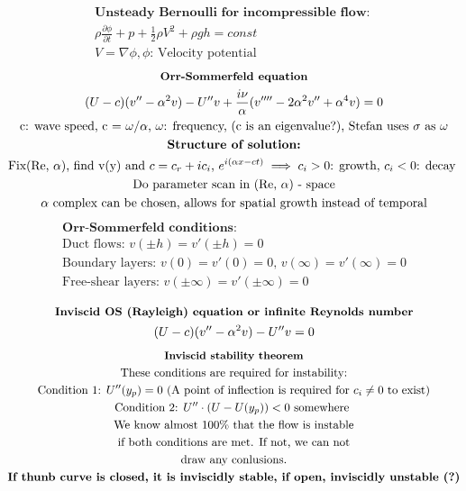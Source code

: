 \documentclass[10pt, a4paper]{article}
\newcommand{\derivative}[2]{\frac{\partial #1}{\partial #2}}
\begin{document}
\begin{gather*}
    \textbf{Unsteady Bernoulli for incompressible flow: } \\
    \rho \derivative{\phi}{t} + p + \frac{1}{2} \rho V^2 + \rho g h = const \\ 
    V = \nabla \phi, \phi \text{: Velocity potential} 
\end{gather*}
\begin{gather*}
    \textbf{\small Orr-Sommerfeld equation} \\
    (U - c)(v''-\alpha^2 v) - U''v + \frac{i\nu}{\alpha}(v''''-2\alpha^2v''+\alpha^4v) = 0 \\ 
    \text{c: wave speed, c = $\omega/\alpha$, $\omega$: frequency, (c is an eigenvalue?), Stefan uses $\sigma$ as $\omega$} \\
    \textbf{Structure of solution:} \\
    \text{Fix(Re, $\alpha$), find v(y) and $c = c_r + ic_i$, $e^{i(\alpha x - c t)} \implies c_i > 0$: growth, $c_i < 0$: decay } \\ 
    \text{Do parameter scan in (Re, $\alpha$) - space} \\
    \text{$\alpha$ complex can be chosen, allows for spatial growth instead of temporal}
\end{gather*}
\begin{gather*}
    \textbf{Orr-Sommerfeld conditions:} \\
    \text{Duct flows: } v(\pm h) = v'(\pm h) = 0 \\
    \text{Boundary layers: } v(0) = v'(0) = 0 \text{, } v(\infty) = v'(\infty) = 0 \\
    \text{Free-shear layers: } v(\pm \infty) = v'(\pm \infty) = 0 \\
\end{gather*}
\begin{gather*}
    \textbf{\small Inviscid OS (Rayleigh) equation or infinite Reynolds number} \\
    (U - c)(v''-\alpha^2 v) - U''v = 0
\end{gather*}
\begin{gather*}
    \textbf{\small Inviscid stability theorem} \\
    \text{These conditions are required for instability:} \\
    \text{Condition 1: $U''(y_p) = 0$ (A point of inflection is required for $c_i \neq 0$ to exist)} \\
    \text{Condition 2: $U''\cdot(U-U(y_p)) < 0$ somewhere } \\
    \text{We know almost 100\% that the flow is instable}\\
    \text{if both conditions are met. If not, we can not} \\
    \text{draw any conlusions.} \\
    \textbf{If thunb curve is closed, it is inviscidly stable, if open, inviscidly unstable (?)}
\end{gather*}
\end{document}
